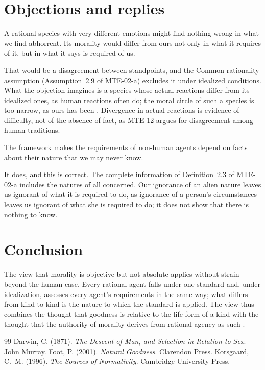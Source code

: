\documentclass{situationist-preprint}
\begin{document}
\section{Objections and replies}\label{s:obj}

\begin{objection}
A rational species with very different emotions might find nothing wrong in what we find abhorrent. Its morality would differ from ours not only in what it requires of it, but in what it says is required of us.
\end{objection}

\begin{reply}
That would be a disagreement between standpoints, and the Common rationality assumption (Assumption~2.9 of MTE-02-a) excludes it under idealized conditions. What the objection imagines is a species whose actual reactions differ from its idealized ones, as human reactions often do; the moral circle of such a species is too narrow, as ours has been \citep{Darwin1871}. Divergence in actual reactions is evidence of difficulty, not of the absence of fact, as MTE-12 argues for disagreement among human traditions.
\end{reply}

\begin{objection}
The framework makes the requirements of non-human agents depend on facts about their nature that we may never know.
\end{objection}

\begin{reply}
It does, and this is correct. The complete information of Definition~2.3 of MTE-02-a includes the natures of all concerned. Our ignorance of an alien nature leaves us ignorant of what it is required to do, as ignorance of a person's circumstances leaves us ignorant of what she is required to do; it does not show that there is nothing to know.
\end{reply}

\section{Conclusion}

The view that morality is objective but not absolute applies without strain beyond the human case. Every rational agent falls under one standard and, under idealization, assesses every agent's requirements in the same way; what differs from kind to kind is the nature to which the standard is applied. The view thus combines the thought that goodness is relative to the life form of a kind \citep{Foot2001} with the thought that the authority of morality derives from rational agency as such \citep{Korsgaard1996}.

\begin{thebibliography}{99}\small
{} Darwin, C. (1871). \emph{The Descent of Man, and Selection in Relation to Sex}. John Murray.
 Foot, P. (2001). \emph{Natural Goodness}. Clarendon Press.
 Korsgaard, C.~M. (1996). \emph{The Sources of Normativity}. Cambridge University Press.
\end{thebibliography}
\end{document}
